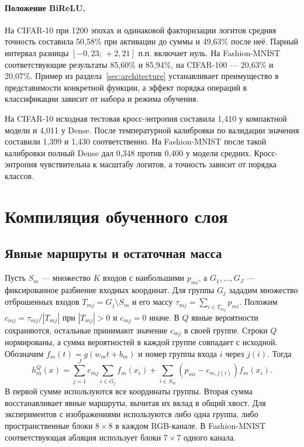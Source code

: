 \documentclass[11pt,a4paper]{article}
\begin{document}
\paragraph{Положение BiReLU.} На CIFAR-10 при 1200 эпохах и одинаковой факторизации логитов средняя точность составила 50,58\% при активации до суммы и 49,63\% после неё. Парный интервал разницы $[-0{,}23;\,+2{,}21]$ п.п. включает нуль. На Fashion-MNIST соответствующие результаты 85,60\% и 85,94\%, на CIFAR-100 — 20,63\% и 20,07\%. Пример из раздела~\ref{sec:architecture} устанавливает преимущество в представимости конкретной функции, а эффект порядка операций в классификации зависит от набора и режима обучения.

На CIFAR-10 исходная тестовая кросс-энтропия составила 1,410 у компактной модели и 4,011 у Dense. После температурной калибровки по валидации \cite{guo2017} значения составили 1,399 и 1,430 соответственно. На Fashion-MNIST после такой калибровки полный Dense дал 0,348 против 0,400 у модели средних. Кросс-энтропия чувствительна к масштабу логитов, а точность зависит от порядка классов.

\section{Компиляция обученного слоя}
\subsection{Явные маршруты и остаточная масса}
Пусть $S_m$ — множество $K$ входов с наибольшими $p_{mi}$, а $G_1,\ldots,G_J$ — фиксированное разбиение входных координат. Для группы $G_j$ зададим множество отброшенных входов $T_{mj}=G_j\setminus S_m$ и его массу $\tau_{mj}=\sum_{i\in T_{mj}}p_{mi}$. Положим $c_{mj}=\tau_{mj}/|T_{mj}|$ при $|T_{mj}|>0$ и $c_{mj}=0$ иначе. В $Q$ явные вероятности сохраняются, остальные принимают значение $c_{mj}$ в своей группе. Строки $Q$ нормированы, а сумма вероятностей в каждой группе совпадает с исходной. Обозначим $f_m(t)=g(w_m t+b_m)$ и номер группы входа $i$ через $j(i)$. Тогда
\begin{equation}
 h_m^Q(x)=
 \sum_{j=1}^J c_{mj}\sum_{i\in G_j} f_m(x_i)
 +\sum_{i\in S_m}(p_{mi}-c_{m,j(i)}) f_m(x_i).
 \label{eq:sparse}
\end{equation}
В первой сумме используются все координаты группы. Вторая сумма восстанавливает явные маршруты, вычитая их вклад в общий хвост. Для экспериментов с изображениями используются либо одна группа, либо пространственные блоки $8\times8$ в каждом RGB-канале. В Fashion-MNIST соответствующая абляция использует блоки $7\times7$ одного канала.
\end{document}
